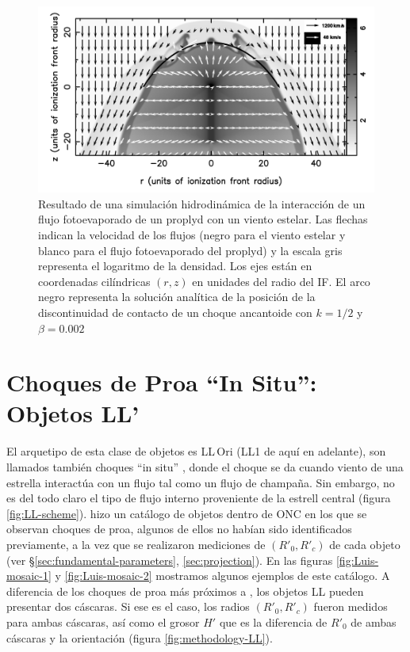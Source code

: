 \begin{figure}
  \centering
  \includegraphics[width=0.7\linewidth]{./Figures/GA-simulation}
  \caption{Resultado de una simulación hidrodinámica de la interacción de un flujo fotoevaporado de un proplyd con un viento estelar. Las flechas indican la velocidad de los flujos (negro para el viento estelar y blanco para el flujo fotoevaporado del proplyd) y la escala gris representa el logaritmo de la densidad. Los ejes están en coordenadas cilíndricas $(r, z)$ en unidades del radio del IF. El arco negro representa la solución analítica de la posición de la discontinuidad de contacto de un choque ancantoide con $k=1/2$ y $\beta=0.002$ \citep{Garcia-Arredondo:2001}}
  \label{fig:simulation}
\end{figure}

\section[Objetos LL]{Choques de Proa ``In Situ'': Objetos LL'}

El arquetipo de esta clase de objetos es LL\,Ori (LL1 de aquí en adelante), son llamados también choques ``in situ'' \citep{Kobulnicky:2016}, donde el choque se da cuando viento de una estrella interactúa con un flujo tal como un flujo de champaña. Sin embargo, no es del todo claro el tipo de flujo interno proveniente de la estrell central (figura \ref{fig:LL-scheme}). \citet{Gutierrez-Soto:2015a} hizo un catálogo de objetos dentro de ONC en los que se observan choques de proa, algunos de ellos no habían sido identificados previamente, a la vez que se realizaron mediciones de $(R'_0, R'_c)$ de cada objeto (ver \S \ref{sec:fundamental-parameters}, \ref{sec:projection}). En las figuras \ref{fig:Luis-mosaic-1} y \ref{fig:Luis-mosaic-2} mostramos algunos ejemplos de este catálogo. A diferencia de los choques de proa más próximos a \thC{}, los objetos LL pueden presentar dos cáscaras. Si ese es el caso, los radios $(R'_0, R'_c)$ fueron medidos para ambas cáscaras, así como el grosor $H'$ que es la diferencia de $R'_0$ de ambas cáscaras y la orientación (figura \ref{fig:methodology-LL}).

